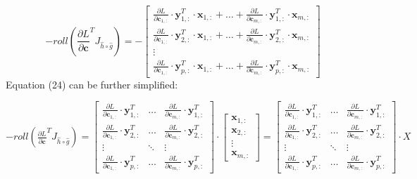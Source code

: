 \documentclass{article}
\begin{document}
\begin{equation}
    -roll(\frac{\partial L}{\partial \mathbf{c}}^{T} J_{\widehat{h}\circ\widehat{g}}) = -
    \begin{bmatrix}
        \frac{\partial L}{\partial \mathbf{c}_{1,:}} \cdot \mathbf{y}^T_{1,:}\cdot \mathbf{x}_{1,:}   + \hdots + \frac{\partial L}{\partial \mathbf{c}_{m,:}} \cdot \mathbf{y}^T_{1,:}\cdot \mathbf{x}_{m,:} \\
        \frac{\partial L}{\partial \mathbf{c}_{1,:}} \cdot \mathbf{y}^T_{2,:}\cdot \mathbf{x}_{1,:}   + \hdots + \frac{\partial L}{\partial \mathbf{c}_{m,:}} \cdot \mathbf{y}^T_{2,:}\cdot \mathbf{x}_{m,:} \\
        \vdots\\
        \frac{\partial L}{\partial \mathbf{c}_{1,:}} \cdot \mathbf{y}^T_{p,:}\cdot \mathbf{x}_{1,:}   + \hdots + \frac{\partial L}{\partial \mathbf{c}_{m,:}} \cdot \mathbf{y}^T_{p,:}\cdot \mathbf{x}_{m,:} 
    \end{bmatrix}
\end{equation}
Equation (24) can be further simplified:
\begin{center}
    $-roll(\frac{\partial L}{\partial \mathbf{c}}^{T} J_{\widehat{h}\circ\widehat{g}}) = \begin{bmatrix}
        \frac{\partial L}{\partial \mathbf{c}_{1,:}} \cdot \mathbf{y}^T_{1,:} & \hdots & \frac{\partial L}{\partial \mathbf{c}_{m,:}} \cdot \mathbf{y}^T_{1,:} \\
        \frac{\partial L}{\partial \mathbf{c}_{1,:}} \cdot \mathbf{y}^T_{2,:}  &\hdots & \frac{\partial L}{\partial \mathbf{c}_{m, :}} \cdot \mathbf{y}^T_{2,:}\\
        \vdots & \ddots & \vdots\\
        \frac{\partial L}{\partial \mathbf{c}_{1,:}} \cdot \mathbf{y}^T_{p,:} &  \hdots & \frac{\partial L}{\partial \mathbf{c}_{m,:}} \cdot \mathbf{y}^T_{p,:} 
    \end{bmatrix} \cdot \begin{bmatrix}
        \mathbf{x}_{1,:} \\ \mathbf{x}_{2,:} \\ \vdots \\ \mathbf{x}_{m,:}
    \end{bmatrix} = \begin{bmatrix}
        \frac{\partial L}{\partial \mathbf{c}_{1,:}} \cdot \mathbf{y}^T_{1,:} & \hdots & \frac{\partial L}{\partial \mathbf{c}_{m,:}} \cdot \mathbf{y}^T_{1,:} \\
        \frac{\partial L}{\partial \mathbf{c}_{1,:}} \cdot \mathbf{y}^T_{2,:}  &\hdots & \frac{\partial L}{\partial \mathbf{c}_{m, :}} \cdot \mathbf{y}^T_{2,:}\\
        \vdots & \ddots & \vdots\\
        \frac{\partial L}{\partial \mathbf{c}_{1,:}} \cdot \mathbf{y}^T_{p,:} &  \hdots & \frac{\partial L}{\partial \mathbf{c}_{m,:}} \cdot \mathbf{y}^T_{p,:} 
    \end{bmatrix} \cdot X$
\end{center}
\end{document}
